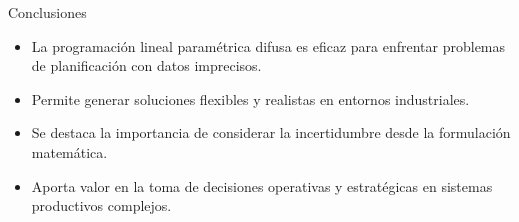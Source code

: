 \documentclass{beamer}
\begin{document}
\begin{frame}{Conclusiones}
\begin{itemize}
    \item La programación lineal paramétrica difusa es eficaz para enfrentar problemas de planificación con datos imprecisos.
    \item Permite generar soluciones flexibles y realistas en entornos industriales.
    \item Se destaca la importancia de considerar la incertidumbre desde la formulación matemática.
    \item Aporta valor en la toma de decisiones operativas y estratégicas en sistemas productivos complejos.
\end{itemize}
\end{frame}
\end{document}
